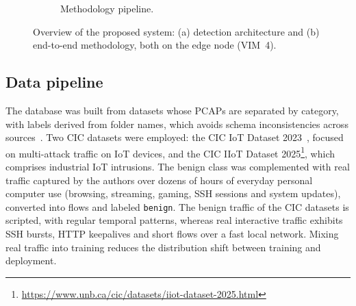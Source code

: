 \documentclass[conference]{IEEEtran}
\begin{document}
\begin{figure}[t]
\begin{subfigure}[b]{0.36\columnwidth}
{}
\caption{Methodology pipeline.}
\label{fig:methodology}
\end{subfigure}
\caption{Overview of the proposed system: (a) detection architecture and (b) end-to-end methodology, both on the edge node (VIM~4).}
\label{fig:overview}
\end{figure}

\subsection{Data pipeline}
\label{subsec:pipeline}

The database was built from datasets whose PCAPs are separated by category, with labels derived from folder names, which avoids schema
inconsistencies across sources~\cite{sharafaldin:18}. Two CIC datasets were
employed: the CIC IoT Dataset 2023~\cite{neto:23}, focused on multi-attack
traffic on IoT devices, and the CIC IIoT Dataset
2025\footnote{\url{https://www.unb.ca/cic/datasets/iiot-dataset-2025.html}}, which comprises industrial IoT intrusions. The benign class was complemented with real traffic captured by the authors over dozens of hours of everyday personal computer use (browsing, streaming, gaming, SSH sessions and system updates), converted into flows and labeled \texttt{benign}. The benign traffic of the CIC datasets is scripted, with regular temporal patterns, whereas real interactive traffic exhibits SSH bursts, HTTP keepalives and short flows over a fast local network. Mixing real traffic into training reduces the distribution shift between training and deployment.
\end{document}
